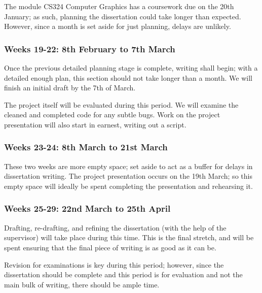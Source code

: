 \documentclass[12pt, a4paper, bibliography=totocnumbered]{scrartcl}
\begin{document}
The module CS324 Computer Graphics has a coursework due on the 20th January; as such, planning the dissertation could take longer than expected. However, since a month is set aside for just planning, delays are unlikely.

\subsubsection{Weeks 19-22: 8th February to 7th March}

Once the previous detailed planning stage is complete, writing shall begin; with a detailed enough plan, this section should not take longer than a month. We will finish an initial draft by the 7th of March.

The project itself will be evaluated during this period. We will examine the cleaned and completed code for any subtle bugs. Work on the project presentation will also start in earnest, writing out a script.

\subsubsection{Weeks 23-24: 8th March to 21st March}

These two weeks are more empty space; set aside to act as a buffer for delays in dissertation writing. The project presentation occurs on the 19th March; so this empty space will ideally be spent completing the presentation and rehearsing it.

\subsubsection{Weeks 25-29: 22nd March to 25th April}

Drafting, re-drafting, and refining the dissertation (with the help of the supervisor) will take place during this time. This is the final stretch, and will be spent ensuring that the final piece of writing is as good as it can be.

Revision for examinations is key during this period; however, since the dissertation should be complete and this period is for evaluation and not the main bulk of writing, there should be ample time.


\end{document}
